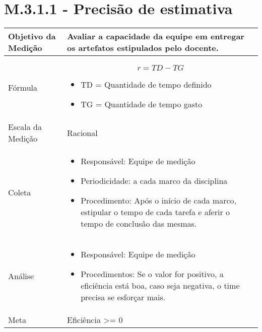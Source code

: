\section{M.3.1.1 - Precisão de estimativa} %

	\begin{tabular}{ |p{4cm}|p{8cm}|  }
	 \hline
	 Objetivo da Medição 		&  	 Avaliar a capacidade da equipe em entregar os artefatos estipulados pelo docente.  \\ %
	 \hline
	 Fórmula		& 	 \[ r = TD - TG \]	\begin{itemize} \item TD = Quantidade de tempo definido \item TG = Quantidade de tempo gasto \end{itemize}\\
	 \hline
	 Escala da Medição 		& 	Racional	 \\
	 \hline
	 Coleta		& 	\begin{itemize} \item Responsável: Equipe de medição \item Periodicidade: a cada marco da disciplina \item Procedimento: Após o início de cada marco, estipular o tempo de cada tarefa e aferir o tempo de conclusão das mesmas. \end{itemize}	\\
	 \hline
	 Análise		& 	\begin{itemize} \item Responsável: Equipe de medição \item Procedimentos: Se o valor for positivo, a eficiência está boa, caso seja negativa, o time precisa se esforçar mais. \end{itemize}	 \\
	 \hline
	 Meta		& 	Eficiência >= 0	 \\
	 \hline
	\end{tabular}




